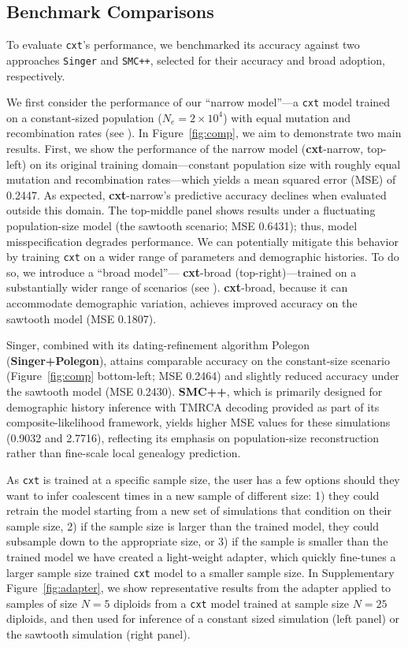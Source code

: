 \documentclass{article}
\newcommand{\cxtkit}{\texttt{cxt}\xspace}
\let\citep\parencite
\newcommand{\singer}{\texttt{Singer}\xspace}
\newcommand{\smcpp}{\texttt{SMC++}\xspace}
\begin{document}
\subsection*{Benchmark Comparisons}

To evaluate \cxtkit's performance, we benchmarked its accuracy against two approaches 
\singer and \smcpp \citep{deng_robust_2024, terhorst_robust_2017}, selected for their 
accuracy and broad adoption, respectively.

We first consider the performance of our ``narrow model''---a \cxtkit{}
model trained on a constant-sized population (\(N_e = 2 \times 10^{4}\))
with equal mutation and recombination rates (see ).
In Figure~\ref{fig:comp}, we aim to demonstrate two main results.
First, we show the performance of the narrow model (\textbf{cxt}-narrow, top-left)
on its original training domain---constant population size with roughly equal
mutation and recombination rates---which yields a mean squared error (MSE) of 0.2447.
As expected, \textbf{cxt}-narrow's predictive accuracy declines when evaluated
outside this domain. The top-middle panel shows results under a fluctuating
population-size model (the sawtooth scenario; MSE 0.6431); thus, model
misspecification degrades performance.
We can potentially mitigate this behavior by training \cxtkit{} on a wider range
of parameters and demographic histories. To do so, we introduce a ``broad model''---%
\textbf{cxt}-broad (top-right)---trained on a substantially wider range of scenarios
(see ). 
\textbf{cxt}-broad, because it can accommodate demographic variation,
achieves improved accuracy on the sawtooth model (MSE 0.1807). 


Singer, combined with its dating-refinement algorithm Polegon (\textbf{Singer+Polegon}), 
attains comparable accuracy on the constant-size scenario (Figure~\ref{fig:comp} bottom-left; MSE 0.2464)
and slightly reduced accuracy under the sawtooth model (MSE 0.2430). 
\textbf{SMC++}, which is primarily designed for demographic history inference with 
TMRCA decoding provided as part of its composite-likelihood framework, 
yields higher MSE values for these simulations (0.9032 and 2.7716), 
reflecting its emphasis on population-size reconstruction rather than fine-scale local genealogy prediction.

As \cxtkit is trained at a specific sample size, the user has a few options should
they want to infer coalescent times in a new sample of different size: 
1) they could retrain the model starting from a new set of simulations that condition on their sample size, 
2) if the sample size is larger than the trained model, they could subsample down to the appropriate size,
or 3) if the sample is smaller than the trained model we have created a light-weight adapter, which quickly fine-tunes
a larger sample size trained \cxtkit model to a smaller sample size. In Supplementary Figure~\ref{fig:adapter}, we show
representative results from the adapter applied to samples of size $N=5$ diploids 
from a \cxtkit model trained at sample size $N=25$ diploids, 
and then used for inference of a constant sized simulation (left panel) or the sawtooth simulation (right panel).
\end{document}
